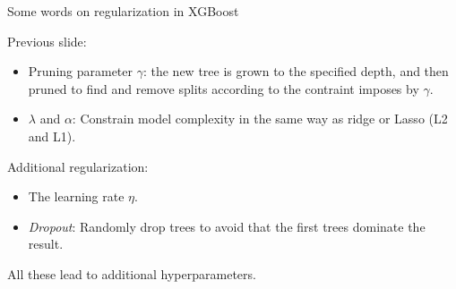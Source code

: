 \documentclass[
  10pt,
  ignorenonframetext,
]{beamer}
\providecommand{\tightlist}{%
  \setlength{\itemsep}{0pt}\setlength{\parskip}{0pt}}
\begin{document}
\begin{frame}
\begin{block}{Some words on regularization in XGBoost}
\protect\hypertarget{some-words-on-regularization-in-xgboost}{}
\(~\)

Previous slide:

\vspace{2mm}

\begin{itemize}
\tightlist
\item
  Pruning parameter \(\gamma\): the new tree is grown to the specified
  depth, and then pruned to find and remove splits according to the
  contraint imposes by \(\gamma\).
\end{itemize}

\vspace{2mm}

\begin{itemize}
\tightlist
\item
  \(\lambda\) and \(\alpha\): Constrain model complexity in the same way
  as ridge or Lasso (L2 and L1).
\end{itemize}

\vspace{4mm}

Additional regularization:

\vspace{2mm}

\begin{itemize}
\tightlist
\item
  The learning rate \(\eta\).
\end{itemize}

\vspace{3mm}

\begin{itemize}
\tightlist
\item
  \emph{Dropout}: Randomly drop trees to avoid that the first trees
  dominate the result.
\end{itemize}

\vspace{3mm}

All these lead to additional hyperparameters.
\end{block}
\end{frame}
\end{document}
